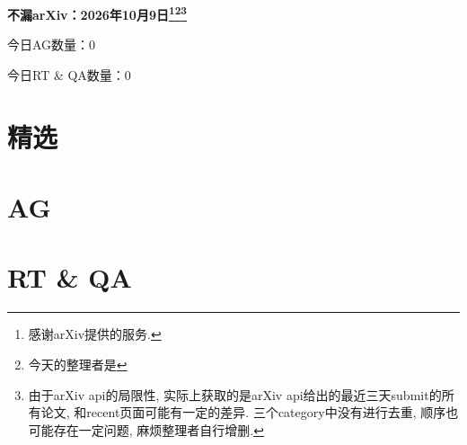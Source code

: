 \documentclass[9pt, a4paper]{article}
\theoremstyle{plain}
\theoremstyle{definition}
\theoremstyle{remark}
\newcommand{\AGnumber}{0}
\newcommand{\RTQAnumber}{0}
\newcommand{\NewestDate}{2026年10月9日}
\newcommand{\todayarXiver}{} %
\begin{document}
\begin{center}
    \Huge\textbf{不漏arXiv：\NewestDate\footnote{感谢arXiv提供的服务.}\footnote{今天的整理者是\todayarXiver}\footnote{由于arXiv api的局限性, 实际上获取的是arXiv api给出的最近三天submit的所有论文, 和recent页面可能有一定的差异. 三个category中没有进行去重, 顺序也可能存在一定问题, 麻烦整理者自行增删.}} \\
\end{center}

\setcounter{section}{-1}

\begin{center}
    今日AG数量：\AGnumber
    
    今日RT \& QA数量：\RTQAnumber
    
\end{center}


\section{精选}


\section{AG}

\section{RT \& QA}
\end{document}
